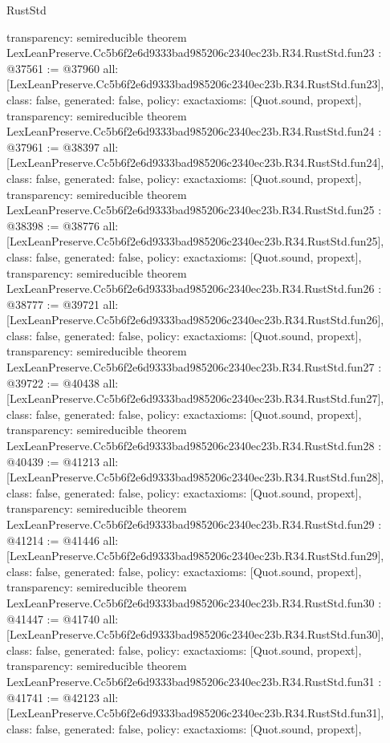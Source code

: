\begin{lexlean}{RustStd}
\begin{coremodule}
{  transparency: semireducible
}
theorem LexLeanPreserve.Cc5b6f2e6d9333bad985206c2340ec23b.R34.RustStd.fun23 : @37561 := @37960 {
  all: [LexLeanPreserve.Cc5b6f2e6d9333bad985206c2340ec23b.R34.RustStd.fun23],
  class: false,
  generated: false,
  policy: exact{axioms: [Quot.sound, propext]},
  transparency: semireducible
}
theorem LexLeanPreserve.Cc5b6f2e6d9333bad985206c2340ec23b.R34.RustStd.fun24 : @37961 := @38397 {
  all: [LexLeanPreserve.Cc5b6f2e6d9333bad985206c2340ec23b.R34.RustStd.fun24],
  class: false,
  generated: false,
  policy: exact{axioms: [Quot.sound, propext]},
  transparency: semireducible
}
theorem LexLeanPreserve.Cc5b6f2e6d9333bad985206c2340ec23b.R34.RustStd.fun25 : @38398 := @38776 {
  all: [LexLeanPreserve.Cc5b6f2e6d9333bad985206c2340ec23b.R34.RustStd.fun25],
  class: false,
  generated: false,
  policy: exact{axioms: [Quot.sound, propext]},
  transparency: semireducible
}
theorem LexLeanPreserve.Cc5b6f2e6d9333bad985206c2340ec23b.R34.RustStd.fun26 : @38777 := @39721 {
  all: [LexLeanPreserve.Cc5b6f2e6d9333bad985206c2340ec23b.R34.RustStd.fun26],
  class: false,
  generated: false,
  policy: exact{axioms: [Quot.sound, propext]},
  transparency: semireducible
}
theorem LexLeanPreserve.Cc5b6f2e6d9333bad985206c2340ec23b.R34.RustStd.fun27 : @39722 := @40438 {
  all: [LexLeanPreserve.Cc5b6f2e6d9333bad985206c2340ec23b.R34.RustStd.fun27],
  class: false,
  generated: false,
  policy: exact{axioms: [Quot.sound, propext]},
  transparency: semireducible
}
theorem LexLeanPreserve.Cc5b6f2e6d9333bad985206c2340ec23b.R34.RustStd.fun28 : @40439 := @41213 {
  all: [LexLeanPreserve.Cc5b6f2e6d9333bad985206c2340ec23b.R34.RustStd.fun28],
  class: false,
  generated: false,
  policy: exact{axioms: [Quot.sound, propext]},
  transparency: semireducible
}
theorem LexLeanPreserve.Cc5b6f2e6d9333bad985206c2340ec23b.R34.RustStd.fun29 : @41214 := @41446 {
  all: [LexLeanPreserve.Cc5b6f2e6d9333bad985206c2340ec23b.R34.RustStd.fun29],
  class: false,
  generated: false,
  policy: exact{axioms: [Quot.sound, propext]},
  transparency: semireducible
}
theorem LexLeanPreserve.Cc5b6f2e6d9333bad985206c2340ec23b.R34.RustStd.fun30 : @41447 := @41740 {
  all: [LexLeanPreserve.Cc5b6f2e6d9333bad985206c2340ec23b.R34.RustStd.fun30],
  class: false,
  generated: false,
  policy: exact{axioms: [Quot.sound, propext]},
  transparency: semireducible
}
theorem LexLeanPreserve.Cc5b6f2e6d9333bad985206c2340ec23b.R34.RustStd.fun31 : @41741 := @42123 {
  all: [LexLeanPreserve.Cc5b6f2e6d9333bad985206c2340ec23b.R34.RustStd.fun31],
  class: false,
  generated: false,
  policy: exact{axioms: [Quot.sound, propext]},
}
\end{coremodule}
\end{lexlean}
